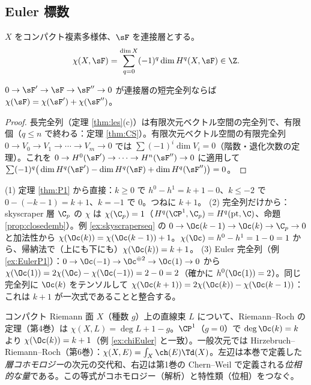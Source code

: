 \subsection{Euler 標数}
\begin{defn}
$X$ をコンパクト複素多様体、$\sF$ を連接層とする。
\[
\chi(X,\sF)=\sum_{q=0}^{\dim X}(-1)^q\dim H^q(X,\sF)\in\Z.
\]
\end{defn}
\begin{prop}[加法性]\label{prop:chiadd}\tP
$0\to\sF'\to\sF\to\sF''\to0$ が連接層の短完全列ならば $\chi(\sF)=\chi(\sF')+\chi(\sF'')$。
\end{prop}
\begin{proof}
長完全列（定理 \ref{thm:les}(c)）は有限次元ベクトル空間の完全列で、有限個（$q\le n$ で終わる：定理 \ref{thm:CS}）。有限次元ベクトル空間の有限完全列 $0\to V_0\to V_1\to\cdots\to V_m\to0$ では $\sum(-1)^i\dim V_i=0$（階数・退化次数の定理）。これを $0\to H^0(\sF')\to\cdots\to H^n(\sF'')\to0$ に適用して $\sum(-1)^q\big(\dim H^q(\sF')-\dim H^q(\sF)+\dim H^q(\sF'')\big)=0$。\qedhere
\end{proof}
\begin{ex}[$\chi(\Oc(k))=k+1$ の二通りの計算]\label{ex:chiEuler}\tP
(1) 定理 \ref{thm:P1} から直接：$k\ge0$ で $h^0-h^1=k+1-0$、$k\le-2$ で $0-(-k-1)=k+1$、$k=-1$ で $0$。つねに $k+1$。
(2) 完全列だけから：skyscraper 層 $\C_p$ の $\chi$ は $\chi(\C_p)=1$（$H^q(\CP^1,\C_p)=H^q(\mathrm{pt},\C)$、命題 \ref{prop:closedemb}）。例 \ref{ex:skyscraperseq} の $0\to\Oc(k-1)\to\Oc(k)\to\C_p\to0$ と加法性から $\chi(\Oc(k))=\chi(\Oc(k-1))+1$。$\chi(\Oc)=h^0-h^1=1-0=1$ から、帰納法で（上にも下にも）$\chi(\Oc(k))=k+1$。
(3) Euler 完全列（例 \ref{ex:EulerP1}）：$0\to\Oc(-1)\to\Oc^{\oplus2}\to\Oc(1)\to0$ から $\chi(\Oc(1))=2\chi(\Oc)-\chi(\Oc(-1))=2-0=2$（確かに $h^0(\Oc(1))=2$）。同じ完全列に $\Oc(k)$ をテンソルして $\chi(\Oc(k+1))=2\chi(\Oc(k))-\chi(\Oc(k-1))$：これは $k+1$ が一次式であることと整合する。
\end{ex}
\begin{ex}\label{ex:RR}\tC
コンパクト Riemann 面 $X$（種数 $g$）上の直線束 $L$ について、Riemann--Roch の定理（第4巻）は $\chi(X,L)=\deg L+1-g$。$\CP^1$（$g=0$）で $\deg\Oc(k)=k$ より $\chi(\Oc(k))=k+1$（例 \ref{ex:chiEuler} と一致）。一般次元では Hirzebruch--Riemann--Roch（第6巻）：$\chi(X,E)=\int_X\ch(E)\Td(X)$。左辺は本巻で定義した\emph{層コホモロジー}の次元の交代和、右辺は第1巻の Chern--Weil で定義される\emph{位相的な量}である。この等式がコホモロジー（解析）と特性類（位相）をつなぐ。
\end{ex}
